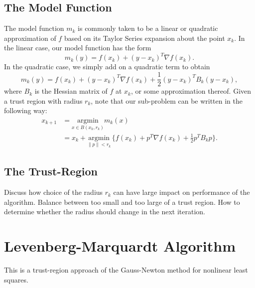 \subsection*{The Model Function}
The model function $m_k$ is commonly taken to be a linear or quadratic approximation of
$f$ based on its Taylor Series expansion about the point $x_k$. In the linear case,
our model function has the form
\[
m_k(y) = f(x_k) + (y-x_k)^T \nabla f(x_k).
\] 
In the quadratic case, we simply add on a quadratic term to obtain
\[
m_k(y) = f(x_k) + (y-x_k)^T \nabla f(x_k) + \frac{1}{2}(y - x_k)^T B_k (y-x_k),
\]
where $B_k$ is the Hessian matrix of $f$ at $x_k$, or some approximation thereof.
Given a trust region with radius $r_k$, note that our sub-problem can be 
written in the following way:
\begin{align*}
x_{k+1} &= \underset{x \in B(x_k, r_k)}{\text{argmin}} m_k(x)\\
&= x_k + \underset{\|p\| < r_k}{\text{argmin}}\, \{f(x_k) + p^T \nabla f(x_k) + \frac{1}{2}p^T B_k p\}.
\end{align*}

\subsection*{The Trust-Region}
Discuss how choice of the radius $r_k$ can have large impact on performance of the algorithm. Balance between
too small and too large of a trust region. How to determine whether the radius should change in the next iteration.

\section*{Levenberg-Marquardt Algorithm}
This is a trust-region approach of the Gauss-Newton method for nonlinear least squares.
